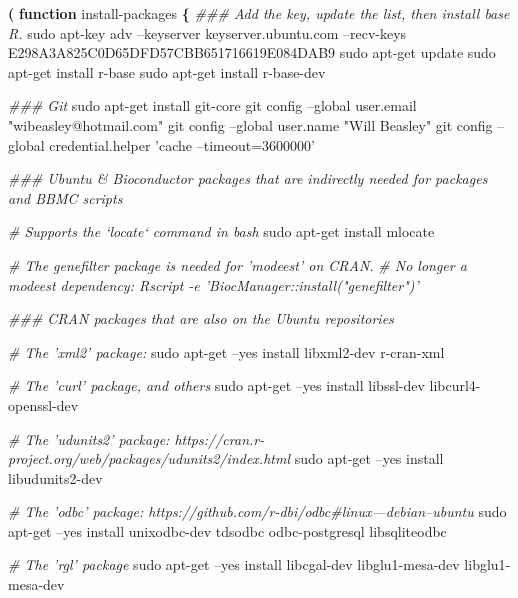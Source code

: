 \documentclass[]{book}
\newenvironment{Shaded}{\begin{snugshade}}{\end{snugshade}}
\newcommand{\CommentTok}[1]{\textcolor[rgb]{0.56,0.35,0.01}{\textit{#1}}}
\newcommand{\FunctionTok}[1]{\textcolor[rgb]{0.00,0.00,0.00}{#1}}
\newcommand{\KeywordTok}[1]{\textcolor[rgb]{0.13,0.29,0.53}{\textbf{#1}}}
\newcommand{\NormalTok}[1]{#1}
\newcommand{\StringTok}[1]{\textcolor[rgb]{0.31,0.60,0.02}{#1}}
\begin{document}
\begin{Shaded}
\begin{Highlighting}[]
\KeywordTok{(} \KeywordTok{function}\FunctionTok{ install-packages} \KeywordTok{\{}
  \CommentTok{### Add the key, update the list, then install base R.}
  \FunctionTok{sudo}\NormalTok{ apt-key adv --keyserver keyserver.ubuntu.com --recv-keys E298A3A825C0D65DFD57CBB651716619E084DAB9}
  \FunctionTok{sudo}\NormalTok{ apt-get update}
  \FunctionTok{sudo}\NormalTok{ apt-get install r-base}
  \FunctionTok{sudo}\NormalTok{ apt-get install r-base-dev}
  
  \CommentTok{### Git}
  \FunctionTok{sudo}\NormalTok{ apt-get install git-core}
  \FunctionTok{git}\NormalTok{ config --global user.email }\StringTok{"wibeasley@hotmail.com"}
  \FunctionTok{git}\NormalTok{ config --global user.name }\StringTok{"Will Beasley"}
  \FunctionTok{git}\NormalTok{ config --global credential.helper }\StringTok{'cache --timeout=3600000'}

  \CommentTok{### Ubuntu & Bioconductor packages that are indirectly needed for packages and BBMC scripts}

  \CommentTok{# Supports the `locate` command in bash}
  \FunctionTok{sudo}\NormalTok{ apt-get install mlocate}

  \CommentTok{# The genefilter package is needed for 'modeest' on CRAN.}
  \CommentTok{# No longer a modeest dependency: Rscript -e 'BiocManager::install("genefilter")'}
  
  \CommentTok{### CRAN packages that are also on the Ubuntu repositories}
  
  \CommentTok{# The 'xml2' package:}
  \FunctionTok{sudo}\NormalTok{ apt-get --yes install libxml2-dev r-cran-xml}

  \CommentTok{# The 'curl' package, and others}
  \FunctionTok{sudo}\NormalTok{ apt-get --yes install libssl-dev libcurl4-openssl-dev}

  \CommentTok{# The 'udunits2' package: https://cran.r-project.org/web/packages/udunits2/index.html}
  \FunctionTok{sudo}\NormalTok{ apt-get --yes install libudunits2-dev}

  \CommentTok{# The 'odbc' package: https://github.com/r-dbi/odbc#linux---debian--ubuntu}
  \FunctionTok{sudo}\NormalTok{ apt-get --yes install unixodbc-dev tdsodbc odbc-postgresql libsqliteodbc}

  \CommentTok{# The 'rgl' package}
  \FunctionTok{sudo}\NormalTok{ apt-get --yes install libcgal-dev libglu1-mesa-dev libglu1-mesa-dev}


\end{Highlighting}
\end{Shaded}
\end{document}
